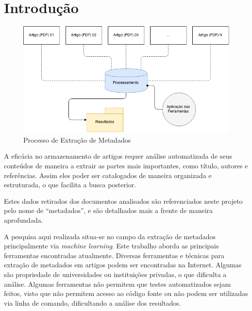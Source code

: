 
\chapter{Introdução}
\label{cha:introduction}


\begin{figure}
	\centering
	\caption{Processo de Extração de Metadados}
	\label{fig:introduction}
	\includegraphics[width=0.9\linewidth]{./assets/images/introduction}
\end{figure}


A eficácia no armazenamento de artigos requer análise automatizada de seus conteúdos de maneira a extrair as partes mais importantes, como título, autores e referências. Assim eles poder ser catalogados de maneira organizada e estruturada, o que facilita a busca posterior.

Estes dados retirados dos documentos analisados são referenciados neste projeto pelo nome de ``metadados'', e são detalhados mais a frente de maneira aprofundada.

A pesquisa aqui realizada situa-se no campo da extração de metadados principalmente via \textit{machine learning}. Este trabalho aborda as principais ferramentas encontradas atualmente. Diversas ferramentas e técnicas para extração de metadados em artigos podem ser encontradas na Internet. Algumas são propriedade de universidades ou instituições privadas, o que dificulta a análise. Algumas ferramentas não permitem que testes automatizados sejam feitos, visto que não permitem acesso ao código fonte ou não podem ser utilizadas via linha de comando, dificultando a análise dos resultados.

